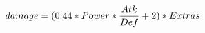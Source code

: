 \documentclass[preview]{standalone}
\begin{document}
\begin{align*}
\special{dvisvgm:raw <g id='unique000'>}damage = (0.44 * Power * \frac{Atk}{Def} + 2) * Extras\special{dvisvgm:raw </g>}
\end{align*}
\end{document}
